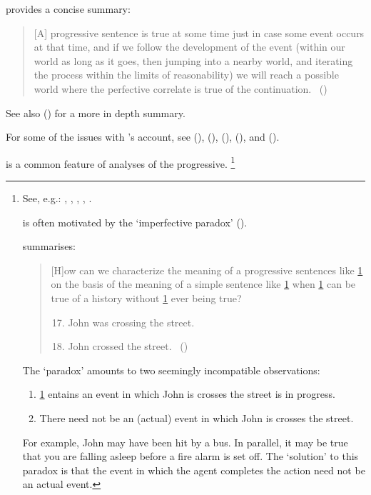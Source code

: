 \begin{note}
{    \textcite{Szabo:2004ul} provides a concise summary:
    \begin{quote}
      [A] progressive sentence is true at some time just in case some event occurs at that time, and if we follow the development of the event (within our world as long as it goes, then jumping into a nearby world, and iterating the process within the limits of reasonability) we will reach a possible world where the perfective correlate is true of the continuation.\newline
      \mbox{ }\hfill\mbox{(\citeyear[34]{Szabo:2004ul})}
    \end{quote}
    See also (\cite[764--766]{Portner:1998um}) for a more in depth summary.

    For some of the issues with \citeauthor{Landman:1992wh}'s account, see (\cite{Bonomi:1997uq}), (\cite[49--50]{Engelberg:1999vi}), (\cite[35]{Szabo:2004ul}), (\cite[767]{Portner:1998um}), and (\cite[esp.][1256]{Portner:2011vi}).
  }

   is a common feature of analyses of the progressive.%
  \footnote{
    See, e.g.:
    \cite{Bennett:1972uw},
    \cite{Dowty:1979vq},
    \cite{Parsons:1990aa},
    \cite{Landman:1992wh},
    \cite{Portner:1998um}.

    \assuPP{} is often motivated by the `imperfective paradox' (\cite[cf.][Ch.3.1]{Dowty:1979vq}).

    \citeauthor{Bach:1986tb} summarises:
    \begin{quote}
      [H]ow can we characterize the meaning of a progressive sentences like \ref{Bach:impP:17} on the basis of the meaning of a simple sentence like \ref{Bach:impP:18} when \ref{Bach:impP:17} can be true of a history without \ref{Bach:impP:18} ever being true?
      \begin{enumerate}[label=(\arabic*), ref=(\arabic*)]
        \setcounter{enumi}{16}
      \item
        \label{Bach:impP:17}
        John was crossing the street.
      \item
        \label{Bach:impP:18}
        John crossed the street.%
        \mbox{ }\hfill\mbox{(\citeyear[12]{Bach:1986tb})}
      \end{enumerate}
    \end{quote}
    The `paradox' amounts to two seemingly incompatible observations:
    \begin{enumerate}[noitemsep]
    \item
      \ref{Bach:impP:17} entains an event in which John is crosses the street is in progress.
    \item
      There need not be an (actual) event in which John is crosses the street.%
    \end{enumerate}
    For example, John may have been hit by a bus.
    In parallel, it may be true that you are falling asleep before a fire alarm is set off.
    The `solution' to this paradox is that the event in which the agent completes the action need not be an actual event.%

}
\end{note}
